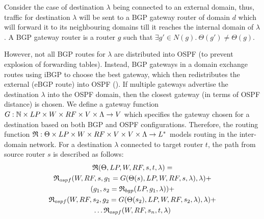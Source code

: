 Consider the case of destination $\lambda$ being connected 
to an external domain, thus, traffic for destination $\lambda$
will be sent to a BGP gateway router of domain $d$ which 
will forward it to its neighbouring domains till
it reaches the internal domain of $\lambda$. A BGP gateway
router is a router $g$ such that $\exists g' \in N(g). 
~\Theta(g') \not= \Theta(g)$. 

However, not all BGP routes for $\lambda$
are distributed 
into OSPF (to prevent explosion of forwarding tables). Instead,
BGP gateways in a domain exchange routes using iBGP to choose
the best gateway, which then redistributes the external
(eBGP route) into OSPF (). If multiple
gateways advertise the destination $\lambda$ into the OSPF 
domain, then the closest gateway (in terms of OSPF distance)
is chosen. We define a gateway function $G: \mathbb{N} \times LP \times
W \times RF \times V \times \Lambda \rightarrow V$ which specifies
the gateway chosen for a destination based on both BGP and OSPF
configurations. Therefore, the routing function 
$\mathfrak{R}:\Theta \times LP \times W \times RF \times V \times V \times \Lambda \rightarrow L^*$ models routing in the inter-domain network. 
For a destination $\lambda$ connected to target router $t$, the 
path from source router $s$ is described as follows:
\begin{multline}
	\mathfrak{R}(\Theta, LP, W, RF, s, t, \lambda) = \\
	\mathfrak{R}_{ospf}(W,RF,s,g_1=G(\Theta(s),LP,W,RF,s,\lambda), \lambda) + \\
	 (g_1, s_2=\mathfrak{R}_{bgp}(LP, g_1, \lambda))+ \\
	\mathfrak{R}_{ospf}(W,RF,s_2,g_2=G(\Theta(s_2),LP,W,RF,s_2,\lambda), \lambda) + \\
	\ldots \mathfrak{R}_{ospf}(W,RF,s_n,t,\lambda)
\end{multline}
